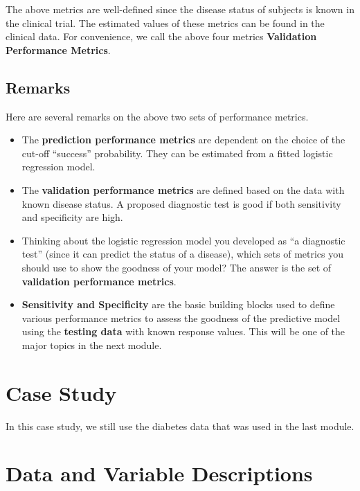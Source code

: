 \documentclass[
]{book}
\begin{document}
The above metrics are well-defined since the disease status of subjects is known in the clinical trial. The estimated values of these metrics can be found in the clinical data. For convenience, we call the above four metrics \textbf{Validation Performance Metrics}.

\hypertarget{remarks}{%
\subsection{Remarks}\label{remarks}}

Here are several remarks on the above two sets of performance metrics.

\begin{itemize}
\item
  The \textbf{prediction performance metrics} are dependent on the choice of the cut-off ``success'' probability. They can be estimated from a fitted logistic regression model.
\item
  The \textbf{validation performance metrics} are defined based on the data with known disease status. A proposed diagnostic test is good if both sensitivity and specificity are high.
\item
  Thinking about the logistic regression model you developed as ``a diagnostic test'' (since it can predict the status of a disease), which sets of metrics you should use to show the goodness of your model? The answer is the set of \textbf{validation performance metrics}.
\item
  \textbf{Sensitivity and Specificity} are the basic building blocks used to define various performance metrics to assess the goodness of the predictive model using the \textbf{testing data} with known response values. This will be one of the major topics in the next module.
\end{itemize}

\hypertarget{case-study}{%
\section{Case Study}\label{case-study}}

In this case study, we still use the diabetes data that was used in the last module.

\hypertarget{data-and-variable-descriptions-1}{%
\section{Data and Variable Descriptions}\label{data-and-variable-descriptions-1}}
\end{document}
